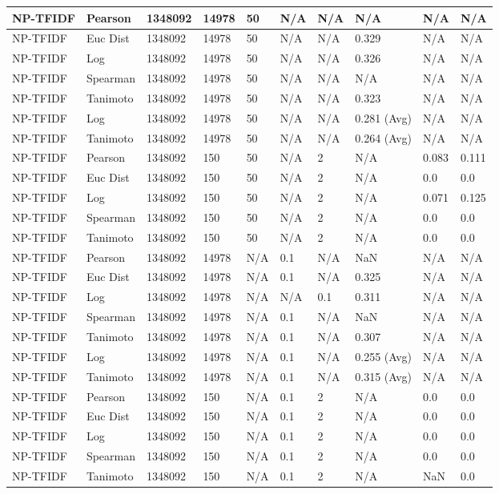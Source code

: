 \documentclass{article}
\begin{document}
\begin{longtable}{ |p{1.7cm}|p{1.9cm}|p{1.5cm}|p{1.5cm}|p{0.75cm}|p{0.75cm}|p{0.75cm}|p{0.75cm}|p{1.5cm}|p{1.5cm}|}
    NP-TFIDF & Pearson & 1348092 & 14978 & 50 & N/A & N/A & N/A & N/A & N/A  \\ \hline
    NP-TFIDF  & Euc Dist & 1348092 & 14978 & 50 & N/A & N/A & 0.329 & N/A & N/A   \\ \hline
    NP-TFIDF  & Log & 1348092 & 14978 &  50 & N/A & N/A & 0.326 & N/A & N/A  \\ \hline
    NP-TFIDF  & Spearman & 1348092 & 14978 & 50 & N/A & N/A & N/A & N/A & N/A \\ \hline
    NP-TFIDF  & Tanimoto & 1348092 & 14978 & 50 & N/A& N/A & 0.323 & N/A & N/A \\ \hline
    NP-TFIDF  & Log & 1348092 & 14978 & 50 & N/A& N/A & 0.281 (Avg) & N/A & N/A \\ \hline
    NP-TFIDF  & Tanimoto & 1348092 & 14978 & 50 & N/A & N/A & 0.264 (Avg) & N/A & N/A \\ \hline
    
    NP-TFIDF  & Pearson & 1348092 & 150 & 50 & N/A  & 2 & N/A & 0.083 & 0.111  \\ \hline
    NP-TFIDF  & Euc Dist & 1348092 & 150 & 50 & N/A  & 2 & N/A &0.0 & 0.0   \\ \hline
    NP-TFIDF  & Log & 1348092 & 150 & 50 & N/A & 2 & N/A & 0.071 & 0.125  \\ \hline
    NP-TFIDF  & Spearman & 1348092 & 150 & 50 & N/A  & 2 & N/A &0.0 & 0.0 \\ \hline
    NP-TFIDF  & Tanimoto & 1348092 & 150 & 50 & N/A  & 2 & N/A & 0.0 & 0.0 \\ \hline
    
    NP-TFIDF & Pearson & 1348092 & 14978 & N/A & 0.1 & N/A & NaN & N/A & N/A  \\ \hline
    NP-TFIDF  & Euc Dist & 1348092 & 14978 & N/A & 0.1 & N/A & 0.325 & N/A & N/A   \\ \hline
    NP-TFIDF  & Log & 1348092 & 14978 & N/A &  N/A & 0.1 & 0.311 & N/A & N/A  \\ \hline
    NP-TFIDF  & Spearman & 1348092 & 14978 & N/A & 0.1 & N/A & NaN & N/A & N/A \\ \hline
    NP-TFIDF  & Tanimoto & 1348092 & 14978 & N/A & 0.1 & N/A & 0.307 & N/A & N/A \\ \hline
    NP-TFIDF  & Log & 1348092 & 14978 & N/A & 0.1 & N/A & 0.255 (Avg) & N/A & N/A \\ \hline
    NP-TFIDF  & Tanimoto & 1348092 & 14978 & N/A & 0.1 & N/A & 0.315 (Avg) & N/A & N/A \\ \hline
    
    NP-TFIDF  & Pearson & 1348092 & 150 & N/A & 0.1 & 2 & N/A & 0.0 & 0.0  \\ \hline
    NP-TFIDF  & Euc Dist & 1348092 & 150 & N/A & 0.1 & 2 & N/A &0.0 & 0.0   \\ \hline
    NP-TFIDF  & Log & 1348092 & 150 & N/A & 0.1 & 2 & N/A & 0.0 & 0.0  \\ \hline
    NP-TFIDF  & Spearman & 1348092 & 150 & N/A & 0.1 & 2 & N/A &0.0 & 0.0 \\ \hline
    NP-TFIDF  & Tanimoto & 1348092 & 150 & N/A & 0.1 & 2 & N/A & NaN & 0.0 \\ \hline
    

\end{longtable}
\end{document}

